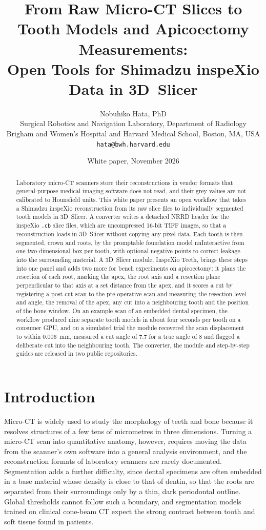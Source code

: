 \documentclass[11pt,a4paper]{article}
\title{From Raw Micro-CT Slices to Tooth Models and Apicoectomy Measurements:\\
Open Tools for Shimadzu inspeXio Data in 3D~Slicer}
\author{Nobuhiko Hata, PhD\\[2pt]
\small Surgical Robotics and Navigation Laboratory, Department of Radiology\\
\small Brigham and Women's Hospital and Harvard Medical School, Boston, MA, USA\\
\small \texttt{hata@bwh.harvard.edu}}
\date{White paper, November 2026}
\begin{document}
\maketitle

\begin{abstract}
Laboratory micro-CT scanners store their reconstructions in vendor formats that general-purpose medical imaging software does not read, and their grey values are not calibrated to Hounsfield units. This white paper presents an open workflow that takes a Shimadzu inspeXio reconstruction from its raw slice files to individually segmented tooth models in 3D~Slicer. A converter writes a detached NRRD header for the inspeXio \texttt{.cb} slice files, which are uncompressed 16-bit TIFF images, so that a reconstruction loads in 3D~Slicer without copying any pixel data. Each tooth is then segmented, crown and roots, by the promptable foundation model nnInteractive from one two-dimensional box per tooth, with optional negative points to correct leakage into the surrounding material. A 3D~Slicer module, InspeXio Teeth, brings these steps into one panel and adds two more for bench experiments on apicoectomy: it plans the resection of each root, marking the apex, the root axis and a resection plane perpendicular to that axis at a set distance from the apex, and it scores a cut by registering a post-cut scan to the pre-operative scan and measuring the resection level and angle, the removal of the apex, any cut into a neighbouring tooth and the position of the bone window. On an example scan of an embedded dental specimen, the workflow produced nine separate tooth models in about four seconds per tooth on a consumer GPU, and on a simulated trial the module recovered the scan displacement to within \SI{0.006}{\milli\metre}, measured a cut angle of 7.7\textdegree{} for a true angle of 8\textdegree{} and flagged a deliberate cut into the neighbouring tooth. The converter, the module and step-by-step guides are released in two public repositories.
\end{abstract}

\section{Introduction}

Micro-CT is widely used to study the morphology of teeth and bone because it resolves structures of a few tens of micrometres in three dimensions. Turning a micro-CT scan into quantitative anatomy, however, requires moving the data from the scanner's own software into a general analysis environment, and the reconstruction formats of laboratory scanners are rarely documented. Segmentation adds a further difficulty, since dental specimens are often embedded in a base material whose density is close to that of dentin, so that the roots are separated from their surroundings only by a thin, dark periodontal outline. Global thresholds cannot follow such a boundary, and segmentation models trained on clinical cone-beam CT expect the strong contrast between tooth and soft tissue found in patients.
\end{document}
